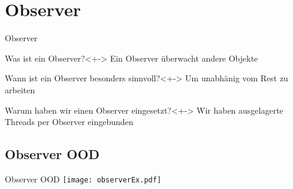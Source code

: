 \section{Observer}
\begin{frame}{Observer}
	\begin{block}{Was ist ein Observer?}<+->
		Ein Observer überwacht andere Objekte
	\end{block}
	\begin{block}{Wann ist ein Observer besonders sinnvoll?}<+->
		Um unabhänig vom Rest zu arbeiten
	\end{block}
	\begin{block}{Warum haben wir einen Observer eingesetzt?}<+->
		Wir haben ausgelagerte Threads per Observer eingebunden
	\end{block}
\end{frame}
\subsection{Observer OOD}
\begin{frame}{Observer OOD}
	\texttt{[image: observerEx.pdf]}
\end{frame}
